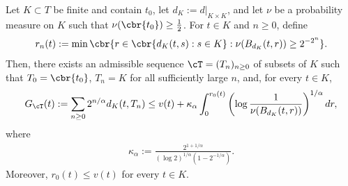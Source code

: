 \documentclass[11pt]{article}
\begin{document}
\begin{lemma}
\label{lem:pointwise_measure_chain}
Let $K\subset T$ be finite and contain $t_0$, let
$d_K:=d|_{K\times K}$, and let $\nu$ be a probability measure on $K$
such that $\nu(\cbr{t_0})\ge\frac12$. For $t\in K$ and $n\ge0$, define
\begin{align*}
r_n(t)
:=
\min\cbr{
r\in\cbr{d_K(t,s):s\in K}:
\nu(B_{d_K}(t,r))\ge2^{-2^n}
}.
\end{align*}
Then, there exists an admissible sequence
$\cT=(T_n)_{n\ge0}$ of subsets of $K$ such that
$T_0=\cbr{t_0}$, $T_n=K$ for all sufficiently large $n$, and, for
every $t\in K$,
\begin{align*}
G_{\cT}(t):=
\sum_{n\ge0}2^{n/\alpha}d_K(t,T_n)\le
v(t)
+
\kappa_\alpha
\int_0^{r_0(t)}
\left(
\log\frac{1}{\nu(B_{d_K}(t,r))}
\right)^{1/\alpha}dr,
\end{align*}
where
\begin{align*}
\kappa_\alpha
:=
\frac{2^{1+1/\alpha}}
{(\log2)^{1/\alpha}(1-2^{-1/\alpha})}.
\end{align*}
Moreover, $r_0(t)\le v(t)$ for every $t\in K$.
\end{lemma}
\end{document}
